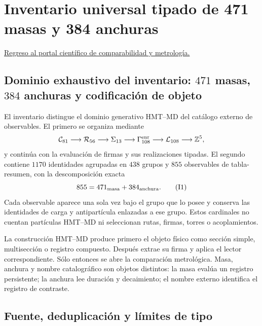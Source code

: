 \chapter{Inventario universal tipado de 471 masas y 384 anchuras}
\label{chap:inventario-universal-471-masas-384-anchuras}
\label{app:inventario-tipado-total-rev6}

\noindent\hyperref[chap:portal-atlas-inventarios-masas]{Regreso al portal científico de comparabilidad y metrología.}

\section{Dominio exhaustivo del inventario: \(471\) masas, \(384\) anchuras y codificación de objeto}

El inventario distingue el dominio generativo HMT--MD del catálogo externo de
observables. El primero se organiza mediante
\[
\mathcal C_{81}\longrightarrow\mathcal R_{56}\longrightarrow\Sigma_{13}
\longrightarrow\Gamma_{108}^{\rm enr}\longrightarrow
\mathcal L_{108}\longrightarrow\mathbb Z^5,
\]
y continúa con la evaluación de firmas y sus realizaciones tipadas. El segundo
contiene \(1170\) identidades agrupadas en \(438\) grupos y \(855\) observables
de tabla-resumen, con la descomposición exacta
\[
855=471_{\rm masa}+384_{\rm anchura}.
\tag{I1}\label{eq:censo-total-observables-pdg-rev6}
\]
Cada observable aparece una sola vez bajo el grupo que lo posee y conserva las
identidades de carga y antipartícula enlazadas a ese grupo. Estos cardinales no
cuentan partículas HMT--MD ni seleccionan rutas, firmas, torres o acoplamientos.

\begin{exactbox}[title={Construcción, evaluación y comparación}]
La construcción HMT--MD produce primero el objeto físico como sección simple,
multisección o registro compuesto. Después extrae su firma y aplica el lector
correspondiente. Sólo entonces se abre la comparación metrológica. Masa,
anchura y nombre catalográfico son objetos distintos: la masa evalúa un
registro persistente; la anchura lee duración y decaimiento; el nombre externo
identifica el registro de contraste.
\end{exactbox}

\section{Fuente, deduplicación y límites de tipo}

